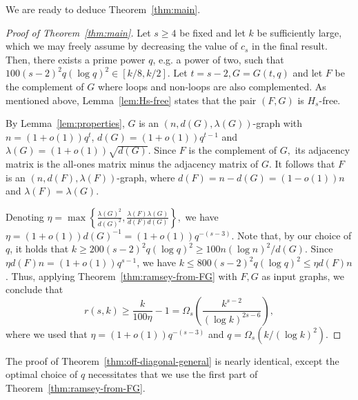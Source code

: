 \documentclass{article}
\theoremstyle{plain}
\theoremstyle{definition}
\begin{document}
We are ready to deduce Theorem~\ref{thm:main}.
\begin{proof}[Proof of Theorem~\ref{thm:main}]
    Let $s \ge 4$ be fixed and let $k$ be sufficiently large, which we may freely assume by decreasing the value of $c_s$ in the final result. Then, there exists a prime power $q$, e.g. a power of two, such that $100 (s-2)^2 q (\log q)^2 \in [k/8, k/2]$.
    Let $t = s-2, G = G(t, q)$ and let $F$ be the complement of $G$ where loops and non-loops are also complemented. As mentioned above, Lemma~\ref{lem:Hs-free} states that the pair $(F, G)$ is $H_s$-free.

    By Lemma~\ref{lem:properties}, $G$ is an $(n,d(G),\lambda(G))$-graph with $n = (1+o(1)) q^t$, $d(G) = (1+o(1)) q^{t-1}$ and $\lambda(G) = (1+o(1)) \sqrt{d(G)}.$ Since $F$ is the complement of $G,$ its adjacency matrix is the all-ones matrix minus the adjacency matrix of $G$. It follows that $F$ is an $(n, d(F), \lambda(F))$-graph, where $d(F) = n - d(G) = (1 - o(1)) n$ and $\lambda(F) = \lambda(G)$.

    Denoting $\eta = \max\left\{ \frac{\lambda(G)^2}{d(G)^2}, \frac{\lambda(F) \lambda(G)}{d(F) d(G)} \right\},$ we have $\eta = (1+o(1)) d(G)^{-1} = (1+o(1)) q^{-(s-3)}$. Note that, by our choice of $q$, it holds that $k \ge 200 (s-2)^2 q (\log q)^2 \ge 100 n (\log n)^2 / d(G).$ Since $\eta d(F) n = (1 + o(1)) q^{s-1}$, we have $k \le 800 (s-2)^2 q (\log q)^2 \le \eta d(F) n$. Thus, applying Theorem~\ref{thm:ramsey-from-FG} with $F, G$ as input graphs, we conclude that
    \[ r(s, k) \ge \frac{k}{100 \eta} - 1 = \Omega_s\left( \frac{k^{s-2}}{(\log k)^{2s-6}}\right), \]
    where we used that $\eta = (1 + o(1)) q^{-(s-3)}$ and $q = \Omega_s(k / (\log k)^2)$.
\end{proof}

The proof of Theorem~\ref{thm:off-diagonal-general} is nearly identical, except the optimal choice of $q$ necessitates that we use the first part of Theorem~\ref{thm:ramsey-from-FG}.
\end{document}
